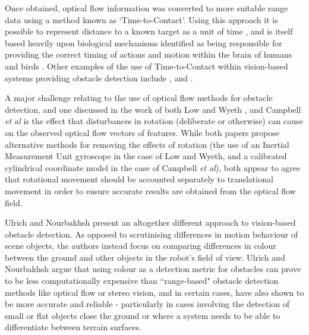 Once obtained, optical flow information was converted to more suitable range data using a method known as `Time-to-Contact'. Using this approach it is possible to represent distance to a known target as a unit of time \cite{alenya}, and is itself based heavily upon biological mechanisms identified as being responsible for providing the correct timing of actions and motion within the brain of humans and birds \cite{lee-young}. Other examples of the use of Time-to-Contact within vision-based systems providing obstacle detection include \cite{alenya}, \cite{sagrebin} and \cite{thomas}.


A major challenge relating to the use of optical flow methods for obstacle detection, and one discussed in the work of both Low and Wyeth \cite{low-wyeth}, and Campbell \textit{et al} \cite{low-wyeth} is the effect that disturbances in rotation (deliberate or otherwise) can cause on the observed optical flow vectors of features. While both papers propose alternative methods for removing the effects of rotation (the use of an Inertial Measurement Unit gyroscope in the case of Low and Wyeth, and a calibrated cylindrical coordinate model in the case of Campbell \textit{et al}), both appear to agree that rotational movement should be accounted separately to translational movement in order to ensure accurate results are obtained from the optical flow field. 



Ulrich and Nourbakhsh \cite{ulrich-nourbakhsh} present an altogether different approach to vision-based obstacle detection. As opposed to scrutinising differences in motion behaviour of scene objects, the authors instead focus on comparing differences in colour between the ground and other objects in the robot's field of view. Ulrich and Nourbakhsh argue that using colour as a detection metric for obstacles can prove to be less computationally expensive than ``range-based" obstacle detection methods like optical flow or stereo vision, and in certain cases, have also shown to be more accurate and reliable - particularly in cases involving the detection of small or flat objects close the ground or where a system needs to be able to differentiate between terrain surfaces. 

